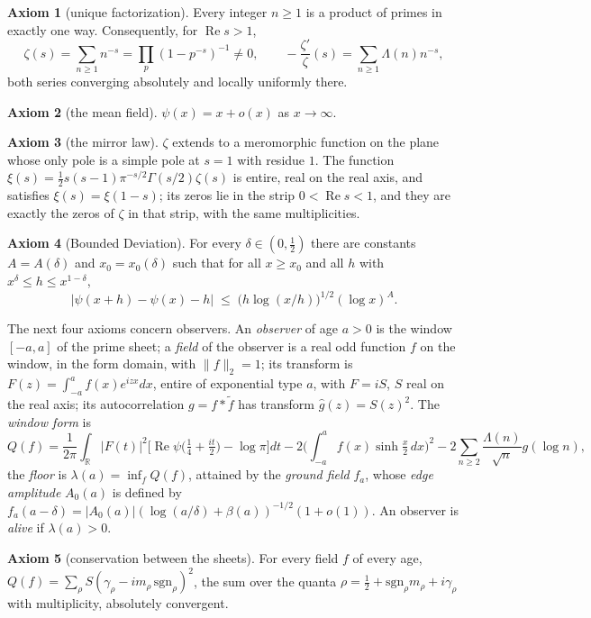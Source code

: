 \documentclass[11pt]{article}
\theoremstyle{definition}
\newtheorem{axiom}{Axiom}
\theoremstyle{remark}
\newcommand{\Ree}{\operatorname{Re}}
\newcommand{\ps}{\psi}
\begin{document}
\begin{axiom}[unique factorization]\label{ax:uf}
Every integer $n\ge1$ is a product of primes in exactly one way. Consequently, for $\Ree s>1$,
\[
\zeta(s)=\sum_{n\ge1}n^{-s}=\prod_p(1-p^{-s})^{-1}\ne0,\qquad -\frac{\zeta'}{\zeta}(s)=\sum_{n\ge1}\Lambda(n)n^{-s},
\]
both series converging absolutely and locally uniformly there.
\end{axiom}

\begin{axiom}[the mean field]\label{ax:pnt}
$\ps(x)=x+o(x)$ as $x\to\infty$.
\end{axiom}

\begin{axiom}[the mirror law]\label{ax:mirror}
$\zeta$ extends to a meromorphic function on the plane whose only pole is a simple pole at $s=1$ with residue $1$. The function $\xi(s)=\tfrac12s(s-1)\pi^{-s/2}\Gamma(s/2)\zeta(s)$ is entire, real on the real axis, and satisfies $\xi(s)=\xi(1-s)$; its zeros lie in the strip $0<\Ree s<1$, and they are exactly the zeros of $\zeta$ in that strip, with the same multiplicities.
\end{axiom}

\begin{axiom}[Bounded Deviation]\label{ax:bd}
For every $\delta\in(0,\tfrac12)$ there are constants $A=A(\delta)$ and $x_0=x_0(\delta)$ such that for all $x\ge x_0$ and all $h$ with $x^{\delta}\le h\le x^{1-\delta}$,
\[
\big|\ps(x+h)-\ps(x)-h\big|\;\le\;\big(h\log(x/h)\big)^{1/2}(\log x)^{A}.
\]
\end{axiom}

The next four axioms concern observers. An \emph{observer} of age $a>0$ is the window $[-a,a]$ of the prime sheet; a \emph{field} of the observer is a real odd function $f$ on the window, in the form domain, with $\|f\|_2=1$; its transform is $F(z)=\int_{-a}^af(x)e^{izx}dx$, entire of exponential type $a$, with $F=iS$, $S$ real on the real axis; its autocorrelation $g=f*\tilde f$ has transform $\hat g(z)=S(z)^2$. The \emph{window form} is
\[
Q(f)=\frac1{2\pi}\int_{\mathbb R}|F(t)|^2\Big[\Ree\psi\big(\tfrac14+\tfrac{it}2\big)-\log\pi\Big]dt-2\Big(\int_{-a}^af(x)\sinh\tfrac x2\,dx\Big)^2-2\sum_{n\ge2}\frac{\Lambda(n)}{\sqrt n}g(\log n),
\]
the \emph{floor} is $\lambda(a)=\inf_fQ(f)$, attained by the \emph{ground field} $f_a$, whose \emph{edge amplitude} $A_0(a)$ is defined by $f_a(a-\delta)=|A_0(a)|(\log(a/\delta)+\beta(a))^{-1/2}(1+o(1))$. An observer is \emph{alive} if $\lambda(a)>0$.

\begin{axiom}[conservation between the sheets]\label{ax:gauss}
For every field $f$ of every age, $Q(f)=\sum_\rho S(\gamma_\rho-im_\rho\,\mathrm{sgn}_\rho)^2$, the sum over the quanta $\rho=\tfrac12+\mathrm{sgn}_\rho m_\rho+i\gamma_\rho$ with multiplicity, absolutely convergent.
\end{axiom}
\end{document}
